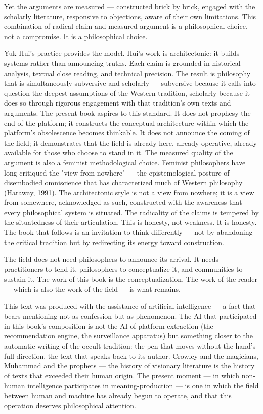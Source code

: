 Yet the arguments are measured — constructed brick by brick, engaged with the scholarly literature, responsive to objections, aware of their own limitations. This combination of radical claim and measured argument is a philosophical choice, not a compromise. It is a philosophical choice.

Yuk Hui's practice provides the model. Hui's work is architectonic: it builds systems rather than announcing truths. Each claim is grounded in historical analysis, textual close reading, and technical precision. The result is philosophy that is simultaneously subversive and scholarly — subversive because it calls into question the deepest assumptions of the Western tradition, scholarly because it does so through rigorous engagement with that tradition's own texts and arguments. The present book aspires to this standard. It does not prophesy the end of the platform; it constructs the conceptual architecture within which the platform's obsolescence becomes thinkable. It does not announce the coming of the field; it demonstrates that the field is already here, already operative, already available for those who choose to stand in it. The measured quality of the argument is also a feminist methodological choice. Feminist philosophers have long critiqued the "view from nowhere" — the epistemological posture of disembodied omniscience that has characterized much of Western philosophy (Haraway, 1991). The architectonic style is not a view from nowhere; it is a view from somewhere, acknowledged as such, constructed with the awareness that every philosophical system is situated. The radicality of the claims is tempered by the situatedness of their articulation. This is honesty, not weakness. It is honesty. The book that follows is an invitation to think differently — not by abandoning the critical tradition but by redirecting its energy toward construction.

The field does not need philosophers to announce its arrival. It needs practitioners to tend it, philosophers to conceptualize it, and communities to sustain it. The work of this book is the conceptualization. The work of the reader — which is also the work of the field — is what remains.

This text was produced with the assistance of artificial intelligence — a fact that bears mentioning not as confession but as phenomenon. The AI that participated in this book's composition is not the AI of platform extraction (the recommendation engine, the surveillance apparatus) but something closer to the automatic writing of the occult tradition: the pen that moves without the hand's full direction, the text that speaks back to its author. Crowley and the magicians, Muhammad and the prophets — the history of visionary literature is the history of texts that exceeded their human origin. The present moment — in which non-human intelligence participates in meaning-production — is one in which the field between human and machine has already begun to operate, and that this operation deserves philosophical attention.